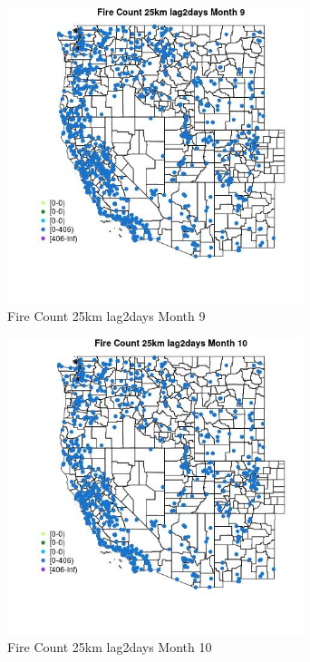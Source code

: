 \begin{figure} 
\centering  
\includegraphics[width=0.77\textwidth]{Code_Outputs/Report_ML_input_PM25_Step4_part_f_de_duplicated_aveswNAs_MapObsMo9Fire_Count_25km_lag2days.jpg} 
\caption{\label{fig:Report_ML_input_PM25_Step4_part_f_de_duplicated_aveswNAsMapObsMo9Fire_Count_25km_lag2days}Fire Count 25km lag2days Month 9} 
\end{figure} 
 

\begin{figure} 
\centering  
\includegraphics[width=0.77\textwidth]{Code_Outputs/Report_ML_input_PM25_Step4_part_f_de_duplicated_aveswNAs_MapObsMo10Fire_Count_25km_lag2days.jpg} 
\caption{\label{fig:Report_ML_input_PM25_Step4_part_f_de_duplicated_aveswNAsMapObsMo10Fire_Count_25km_lag2days}Fire Count 25km lag2days Month 10} 
\end{figure} 
 

